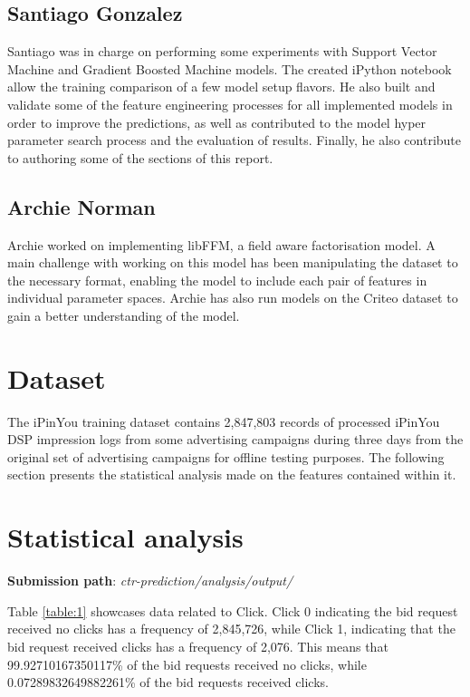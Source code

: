 \documentclass{article} %
\begin{document}
\subsection{Santiago Gonzalez}

Santiago was in charge on performing some experiments with Support Vector Machine and Gradient Boosted Machine models. The created iPython notebook allow the training comparison of a few model setup flavors. He also built and validate some of the feature engineering processes for all implemented models in order to improve the predictions, as well as contributed to the model hyper parameter search process and the evaluation of results. Finally, he also contribute to authoring some of the sections of this report.

\subsection{Archie Norman}

Archie worked on implementing libFFM, a field aware factorisation model. A main challenge with working on this model has been manipulating the dataset to the necessary format, enabling the model to include each pair of features in individual parameter spaces. Archie has also run models on the Criteo dataset to gain a better understanding of the model.

\section{Dataset}

The iPinYou training dataset contains 2,847,803 records of processed iPinYou DSP impression logs from some advertising campaigns during three days from the original set of advertising campaigns for offline testing purposes. The following section presents the statistical analysis made on the features contained within it.

\section{Statistical analysis}

\textbf{Submission path}: \textit{ctr-prediction/analysis/output/}

Table \ref{table:1} showcases data related to Click. Click 0 indicating the bid request received no clicks has a frequency of 2,845,726, while Click 1, indicating that the bid request received clicks has a frequency of 2,076. This means that 99.92710167350117\% of the bid requests received no clicks, while 0.07289832649882261\% of the bid requests received clicks.
\end{document}
